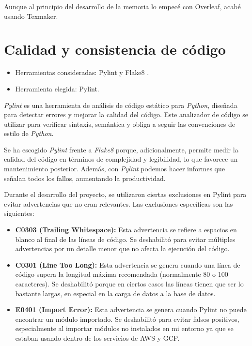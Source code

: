 Aunque al principio del desarrollo de la memoria lo empecé con Overleaf, acabé usando Texmaker. 



\section{Calidad y consistencia de código}\label{calidad_codigo}
\begin{itemize}
\tightlist
\item
  Herramientas consideradas: Pylint \citep{online:pylint} y Flake8 \citep{online:flake8}.
\item
  Herramienta elegida: Pylint.
\end{itemize}

\emph{Pylint} es una herramienta de análisis de código estático para \emph{Python}, 
diseñada para detectar errores y mejorar la calidad del código. Este analizador de código se
utilizar para verificar sintaxis, semántica y obliga a seguir las convenciones de estilo
de \emph{Python}. 

Se ha escogido \emph{Pylint} frente a \emph{Flake8} porque, adicionalmente, permite medir la calidad del código en términos de complejidad y legibilidad, lo que favorece un mantenimiento posterior. Además, con \emph{Pylint} podemos hacer informes que señalan todos los fallos, 
aumentando la productividad.

Durante el desarrollo del proyecto, se utilizaron ciertas exclusiones en Pylint para evitar advertencias que no eran relevantes. Las exclusiones específicas son las siguientes:

\begin{itemize}
    \item \textbf{C0303 (Trailing Whitespace):} Esta advertencia se refiere a espacios en blanco al final de las líneas de código. Se deshabilitó para evitar múltiples advertencias por un detalle menor que no afecta la ejecución del código.
    
    \item \textbf{C0301 (Line Too Long):} Esta advertencia se genera cuando una línea de código supera la longitud máxima recomendada (normalmente 80 o 100 caracteres). Se deshabilitó porque en ciertos casos las líneas tienen que ser lo bastante largas, en especial en la carga de datos a la base de datos.
    
    \item \textbf{E0401 (Import Error):} Esta advertencia se genera cuando Pylint no puede encontrar un módulo importado. Se deshabilitó para evitar falsos positivos, especialmente al importar módulos no instalados en mi entorno ya que se estaban usando dentro de los servicios de AWS y GCP.
\end{itemize}


